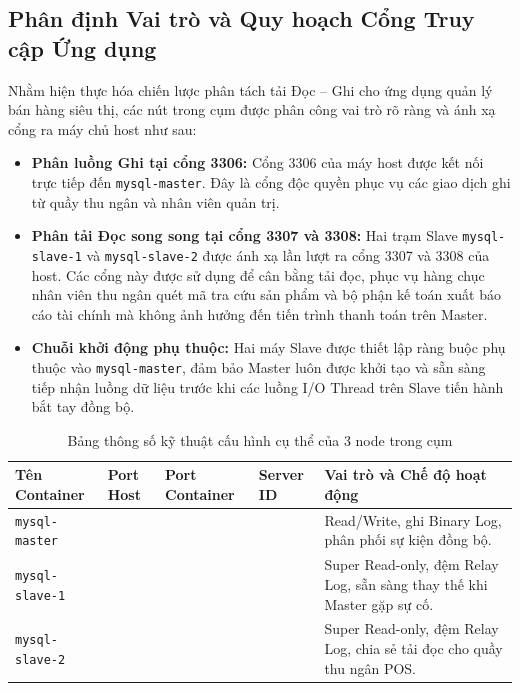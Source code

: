 \documentclass[12pt,a4paper]{report}
\begin{document}
\subsection{Phân định Vai trò và Quy hoạch Cổng Truy cập Ứng dụng}
Nhằm hiện thực hóa chiến lược phân tách tải Đọc -- Ghi cho ứng dụng quản lý bán hàng siêu thị, các nút trong cụm được phân công vai trò rõ ràng và ánh xạ cổng ra máy chủ host như sau:
\begin{itemize}
    \item \textbf{Phân luồng Ghi tại cổng 3306:} Cổng 3306 của máy host được kết nối trực tiếp đến \texttt{mysql-master}. Đây là cổng độc quyền phục vụ các giao dịch ghi từ quầy thu ngân và nhân viên quản trị.
    \item \textbf{Phân tải Đọc song song tại cổng 3307 và 3308:} Hai trạm Slave \texttt{mysql-slave-1} và \texttt{mysql-slave-2} được ánh xạ lần lượt ra cổng 3307 và 3308 của host. Các cổng này được sử dụng để cân bằng tải đọc, phục vụ hàng chục nhân viên thu ngân quét mã tra cứu sản phẩm và bộ phận kế toán xuất báo cáo tài chính mà không ảnh hưởng đến tiến trình thanh toán trên Master.
    \item \textbf{Chuỗi khởi động phụ thuộc:} Hai máy Slave được thiết lập ràng buộc phụ thuộc vào \texttt{mysql-master}, đảm bảo Master luôn được khởi tạo và sẵn sàng tiếp nhận luồng dữ liệu trước khi các luồng I/O Thread trên Slave tiến hành bắt tay đồng bộ.
\end{itemize}

\begin{table}[H]
\centering
\caption{Bảng thông số kỹ thuật cấu hình cụ thể của 3 node trong cụm}
\label{tab:cluster_specs}
\begin{tabularx}{\linewidth}{|>{\raggedright\arraybackslash}p{3.1cm}|>{\centering\arraybackslash}p{1.6cm}|>{\centering\arraybackslash}p{3.4cm}|>{\centering\arraybackslash}p{1.4cm}|>{\raggedright\arraybackslash}X|}
\hline
\textbf{Tên Container} & \textbf{Port Host} & \textbf{Port Container} & \textbf{Server ID} & \textbf{Vai trò và Chế độ hoạt động} \\ \hline
\texttt{mysql-master} & 3306 & 3306 & 1 &  Read/Write, ghi Binary Log, phân phối sự kiện đồng bộ. \\ \hline
\texttt{mysql-slave-1} & 3307 & 3306 & 2 &  Super Read-only, đệm Relay Log, sẵn sàng thay thế khi Master gặp sự cố. \\ \hline
\texttt{mysql-slave-2} & 3308 & 3306 & 3 &  Super Read-only, đệm Relay Log, chia sẻ tải đọc cho quầy thu ngân POS. \\ \hline
\end{tabularx}
\end{table}
\end{document}
